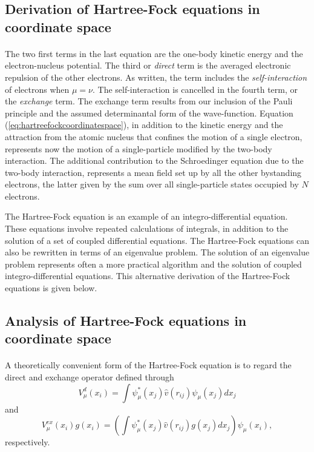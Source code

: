 \documentclass[%
twoside,                 %
final,                   %
10pt]{article}
\begin{document}
\subsection*{Derivation of Hartree-Fock equations in coordinate space}

\paragraph{}
The two first terms in the last equation are the one-body kinetic energy and the
electron-nucleus potential. The third or \emph{direct} term is the averaged electronic repulsion of the other
electrons. As written, the
term includes the \emph{self-interaction} of 
electrons when $\mu=\nu$. The self-interaction is cancelled in the fourth
term, or the \emph{exchange} term. The exchange term results from our
inclusion of the Pauli principle and the assumed determinantal form of
the wave-function. Equation (\ref{eq:hartreefockcoordinatespace}), in addition to the kinetic energy and the attraction from the atomic nucleus that confines the motion of a single electron,   represents now the motion of a single-particle modified by the two-body interaction. The additional contribution to the Schroedinger equation due to the two-body interaction, represents a mean field set up by all the other bystanding electrons, the latter given by the sum over all single-particle states occupied by $N$ electrons. 

The Hartree-Fock equation is an example of an integro-differential equation. These equations involve repeated calculations of integrals, in addition to the solution of a set of coupled differential equations. 
The Hartree-Fock equations can also be rewritten in terms of an eigenvalue problem. The solution of an eigenvalue problem represents often a more practical algorithm and the  solution of  coupled  integro-differential equations.
This alternative derivation of the Hartree-Fock equations is given below.




\subsection*{Analysis of Hartree-Fock equations in coordinate space}

\paragraph{}
  A theoretically convenient form of the
Hartree-Fock equation is to regard the direct and exchange operator
defined through 
\begin{equation*}
  V_{\mu}^{d}(x_i) = \int \psi_{\mu}^*(x_j) 
 \hat{v}(r_{ij})\psi_{\mu}(x_j) dx_j
\end{equation*}
and
\begin{equation*}
  V_{\mu}^{ex}(x_i) g(x_i) 
  = \left(\int \psi_{\mu}^*(x_j) 
 \hat{v}(r_{ij})g(x_j) dx_j
  \right)\psi_{\mu}(x_i),
\end{equation*}
respectively.
\end{document}
